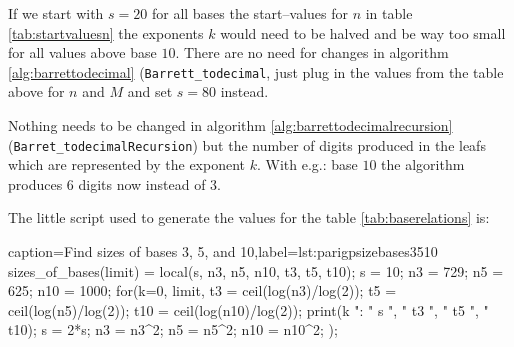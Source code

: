 \documentclass[a4paper,10pt]{article}
\theoremstyle{plain} %
\theoremstyle{definition}
\theoremstyle{remark}
\newcommand*{\smalltt}[1]{\small\texttt{#1}}
\begin{document}
If we start with $s = 20$ for all bases the start--values for $n$ in table \ref{tab:startvaluesn} the exponents $k$ would need to be halved and be way too small for all values above base $10$. There are no need for changes in algorithm \ref{alg:barrettodecimal} (\smalltt{Barrett\_todecimal}, just plug in the values from the table above for $n$ and $M$ and set $s = 80$ instead.

Nothing needs to be changed in algorithm \ref{alg:barrettodecimalrecursion} (\smalltt{Barret\_todecimalRecursion}) but the number of digits produced in the leafs which are represented by the exponent $k$. With e.g.: base $10$ the algorithm produces $6$ digits now instead of $3$.


The little script used to generate the values for the table \ref{tab:baserelations} is:

\lstset{language=parigp}
\begin{pblisting}{caption={Find sizes of bases 3, 5, and 10},label=lst:parigpsizebases3510}
sizes_of_bases(limit) = {
   local(s, n3, n5, n10, t3, t5, t10);
   s = 10;
   n3 = 729;
   n5 = 625;
   n10 = 1000;
   for(k=0, limit,
      t3 = ceil(log(n3)/log(2));
      t5 = ceil(log(n5)/log(2));
      t10 = ceil(log(n10)/log(2));
      print(k ": " s ", " t3 ", " t5 ", " t10);
      s = 2*s;
      n3 = n3^2;
      n5 = n5^2;
      n10 = n10^2;
  );
}
\end{pblisting}
\end{document}
